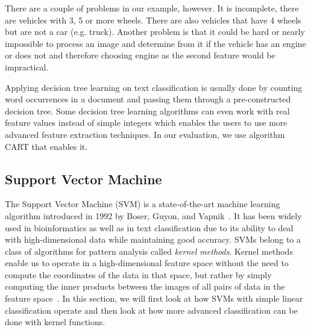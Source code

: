There are a couple of problems in our example, however. It is incomplete, there are vehicles with 3, 5 or more wheels. There are also vehicles that have 4 wheels but are not a car (e.g. truck). Another problem is that it could be hard or nearly impossible to process an image and determine from it if the vehicle has an engine or does not and therefore choosing engine as the second feature would be impractical.

Applying decision tree learning on text classification is usually done by counting word occurrences in a document and passing them through a pre-constructed decision tree. Some decision tree learning algorithms can even work with real feature values instead of simple integers which enables the users to use more advanced feature extraction techniques. In our evaluation, we use algorithm CART that enables it.

\subsection{Support Vector Machine}

The Support Vector Machine (SVM) is a state-of-the-art machine learning algorithm introduced in 1992 by Boser, Guyon, and Vapnik~\cite{boser1992training}. It has been widely used in bioinformatics as well as in text classification due to its ability to deal with high-dimensional data while maintaining good accuracy. SVMs belong to a class of algorithms for pattern analysis called \textit{kernel methods}. Kernel methods enable us to operate in a high-dimensional feature space without the need to compute the coordinates of the data in that space, but rather by simply computing the inner products between the images of all pairs of data in the feature space~\cite{Ben-hur}\cite{manning2008introduction}. In this section, we will first look at how SVMs with simple linear classification operate and then look at how more advanced classification can be done with kernel functions.

